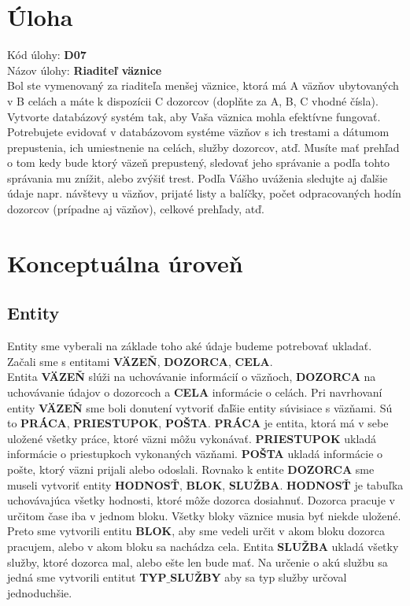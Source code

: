 \documentclass[slovak, 12pt, Times New Roman]{article}
\begin{document}
	\section{Úloha}
		Kód úlohy: \textbf{D07} \\
		Názov úlohy: \textbf{Riaditeľ väznice} \\

		Bol ste vymenovaný za riaditeľa menšej väznice, ktorá má A väzňov ubytovaných v B celách a máte k dispozícii C dozorcov (doplňte za A, B, C vhodné čísla). Vytvorte databázový systém tak, aby Vaša väznica mohla efektívne fungovať. Potrebujete evidovať v databázovom systéme 
		väzňov s ich trestami a dátumom prepustenia, ich umiestnenie na celách, služby dozorcov, atď. Musíte mať prehľad o tom kedy bude ktorý 
		väzeň prepustený, sledovať jeho správanie a podľa tohto správania mu znížit, alebo zvýšiť trest. Podľa Vášho uváženia sledujte aj 
		ďalšie údaje napr. návštevy u väzňov, prijaté listy a balíčky, počet odpracovaných hodín dozorcov (prípadne aj väzňov), celkové 
		prehľady, atď.
	\section{Konceptuálna úroveň}
		\subsection{Entity}
			Entity sme vyberali na základe toho aké údaje budeme potrebovať ukladať. Začali sme s entitami \textbf{VÄZEŇ}, \textbf{DOZORCA}, \textbf{CELA}.\\ Entita \textbf{VÄZEŇ} slúži na uchovávanie informácií o väzňoch, \textbf{DOZORCA} na uchovávanie údajov o dozorcoch a \textbf{CELA} informácie o celách. Pri navrhovaní entity \textbf{VÄZEŇ} sme boli donutení vytvoriť ďaľšie entity súvisiace s väzňami. Sú to \textbf{PRÁCA}, \textbf{PRIESTUPOK}, \textbf{POŠTA}. \textbf{PRÁCA} je entita, ktorá má v sebe uložené všetky práce, ktoré väzni môžu vykonávať. \textbf{PRIESTUPOK} ukladá informácie o priestupkoch vykonaných väzňami. \textbf{POŠTA} ukladá informácie o pošte, ktorý väzni prijali alebo odoslali. Rovnako k entite \textbf{DOZORCA} sme museli vytvoriť entity \textbf{HODNOSŤ}, \textbf{BLOK}, \textbf{SLUŽBA}. \textbf{HODNOSŤ} je tabuľka uchovávajúca všetky hodnosti, ktoré môže dozorca dosiahnuť. Dozorca pracuje v určitom čase iba v jednom bloku. Všetky bloky väznice musia byť niekde uložené. Preto sme vytvorili entitu \textbf{BLOK}, aby sme vedeli určit v akom bloku dozorca pracujem, alebo v akom bloku sa nachádza cela. Entita \textbf{SLUŽBA} ukladá všetky služby, ktoré dozorca mal, alebo ešte len bude mať. Na určenie o akú službu sa jedná sme vytvorili entitut \textbf{TYP$\_$SLUŽBY} aby sa typ služby určoval jednoduchšie.
\end{document}
